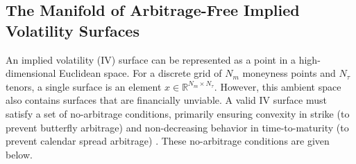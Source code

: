 \documentclass{article}
\begin{document}
\subsection{The Manifold of Arbitrage-Free Implied Volatility Surfaces}

An implied volatility (IV) surface can be represented as a point in a high-dimensional Euclidean space. For a discrete grid of $N_m$ moneyness points and $N_\tau$ tenors, a single surface is an element $x \in \mathbb{R}^{N_m \times N_\tau}$. However, this ambient space also contains surfaces that are financially unviable. A valid IV surface must satisfy a set of no-arbitrage conditions, primarily ensuring convexity in strike (to prevent butterfly arbitrage) and non-decreasing behavior in time-to-maturity (to prevent calendar spread arbitrage) \citep{Gatheral_Jacquier_2014}. These no-arbitrage conditions are given below.
\end{document}
